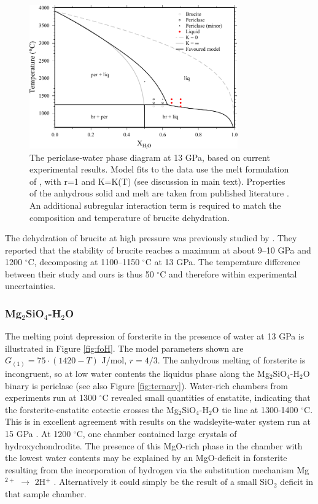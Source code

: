 \documentclass[review]{elsarticle}
\begin{document}
\begin{figure}[ht!]
  \centering
      \includegraphics[width=0.8\textwidth]{figures/periclase_edited}
  \caption{The periclase-water phase diagram at 13 GPa, based on current experimental results. Model fits to the data use the melt formulation of \cite{SS1985}, with r=1 and K=K(T) (see discussion in main text). Properties of the anhydrous solid and melt are taken from published literature \citep{SLB2011, DKS2013}. An additional subregular interaction term is required to match the composition and temperature of brucite dehydration.}
  \label{fig:MH}
\end{figure}



The dehydration of brucite at high pressure was previously studied by \cite{FIYKFO2005}. They reported that the stability of brucite reaches a maximum at about 9--10 GPa and 1200 $^{\circ}$C, decomposing at 1100--1150 $^{\circ}$C at 13 GPa. The temperature difference between their study and ours is thus 50 $^{\circ}$C and therefore within experimental uncertainties. 


\clearpage
\subsubsection{Mg$_2$SiO$_4$-H$_2$O}
The melting point depression of forsterite in the presence of water at 13 GPa is illustrated in Figure \ref{fig:foH}. The model parameters shown are $G_{(1)} = 75 \cdot (1420-T)$ J/mol, $r=4/3$. The anhydrous melting of forsterite is incongruent, so at low water contents the liquidus phase along the Mg$_2$SiO$_4$-H$_2$O binary is periclase (see also Figure \ref{fig:ternary}). Water-rich chambers from experiments run at 1300 $^{\circ}$C revealed small quantities of enstatite, indicating that the forsterite-enstatite cotectic crosses the Mg$_2$SiO$_4$-H$_2$O tie line at 1300-1400 $^{\circ}$C. This is in excellent agreement with results on the wadsleyite-water system run at 15 GPa \citep{DDFK2005, LSOK2011}. At 1200 $^{\circ}$C, one chamber contained large crystals of hydroxychondrodite. The presence of this MgO-rich phase in the chamber with the lowest water contents may be explained by an MgO-deficit in forsterite resulting from the incorporation of hydrogen via the substitution mechanism Mg$^{2+}$ $\rightarrow$ 2H$^+$ \citep{KB2006}. Alternatively it could simply be the result of a small SiO$_2$ deficit in that sample chamber. 
\end{document}
